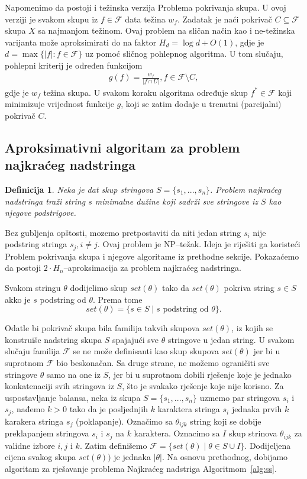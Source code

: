 \documentclass[a4paper, utf8, 11pt, colorlinks]{book}
\newtheorem{definition}{Definicija}
\begin{document}
Napomenimo da postoji i težinska verzija Problema pokrivanja skupa. U ovoj verziji je svakom skupu iz $f \in\mathcal{F}$ data težina $w_f$. Zadatak je naći pokrivač $C \subseteq \mathcal{F}$ skupa $X$ sa najmanjom težinom. Ovaj problem na sličan način kao i ne-težinska varijanta može aproksimirati do na faktor $H_d= \log d+O(1)$, gdje je $d= \max\{|f|:f \in \mathcal{F}\}$ uz pomoć sličnog pohlepnog algoritma. U tom slučaju, pohlepni kriterij je određen funkcijom 
\begin{align}
	g(f) = \frac{w_f}{|f \cap U|}, f \in \mathcal{F}\setminus C,
\end{align}
gdje je $w_f$ težina skupa. U svakom koraku algoritma određuje skup $f^* \in \mathcal{F}$ koji minimizuje vrijednost funkcije $g$, koji se zatim dodaje u trenutni (parcijalni) pokrivač $C$.

\subsection{Aproksimativni algoritam za problem najkraćeg nadstringa}


\begin{definition}
   Neka je dat skup stringova $S=\{s_1,...,s_n\}$. Problem najkraćeg nadstringa traži string  $s$ minimalne dužine koji sadrži sve stringove iz $S$ kao njegove podstrigove. 
  \end{definition}
Bez gubljenja opštosti, mozemo pretpostaviti da niti jedan string $s_i$ nije podstring stringa $s_j, i\neq j$.
Ovaj problem je NP--težak. Ideja je riješiti ga koristeći Problem pokrivanja skupa i 
njegove algoritame iz prethodne sekcije. Pokazaćemo da postoji $2\cdot H_n$--aproksimacija za problem najkraćeg nadstringa. 

 Svakom stringu $\theta$ dodijelimo skup $set(\theta)$ tako da   $set(\theta)$ pokriva string $s\in S$ akko 
je $s$ podstring od $\theta$. Prema tome 
$$set(\theta) = \{ s \in S \mid s \mbox{  podstring od }\theta \}.$$

 Odatle bi pokrivač skupa bila familija takvih skupova $set(\theta)$, iz kojih se konstruiše nadstring skupa $S$ spajajući sve $\theta$ stringove u jedan string. U svakom slučaju familija  $\mathcal{F}$ se ne može definisanti kao skup skupova $set(\theta)$ jer bi u suprotnom $\mathcal{F}$ bio beskonačan. Sa druge strane, ne možemo ograničiti sve stringove $\theta$ samo na one iz $S$, jer bi u suprotnom dobili rješenje koje je jednako konkatenaciji svih stringova iz $S$, što je svakako  rješenje koje nije korisno. Za uspostavljanje balansa, neka iz skupa $S=\{s_1,...,s_n\}$ uzmemo par stringova $s_i$ i $s_j$, nađemo $k>0$  tako da je posljednjih $k$ karaktera stringa $s_i$ jednaka prvih $k$ karakera stringa $s_j$ (poklapanje). Označimo sa $\theta_{ijk}$ string koji se 
dobije preklapanjem stringova $s_i$ i $s_j$ na $k$ karaktera. Oznacimo sa $I$ skup strinova $\theta_{ijk}$  za validne izbore $i,j$ i $k$. Zatim definišemo $\mathcal{F}=\{set(\theta) \mid  \theta \in S \cup I\}$. Dodijeljena cijena svakog skupa $set(\theta))$ je jednaka $|\theta|$. Na osnovu prethodnog, dobijamo algoritam za rješavanje problema Najkraćeg nadstriga Algoritmom~\ref{alg:ss}. 
\end{document}
